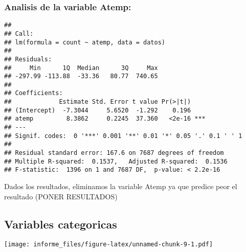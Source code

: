 \documentclass[
]{article}
\begin{document}
\hypertarget{analisis-de-la-variable-atemp}{%
\subsubsection{Analisis de la variable
Atemp:}\label{analisis-de-la-variable-atemp}}

\begin{verbatim}
## 
## Call:
## lm(formula = count ~ atemp, data = datos)
## 
## Residuals:
##     Min      1Q  Median      3Q     Max 
## -297.99 -113.88  -33.36   80.77  740.65 
## 
## Coefficients:
##             Estimate Std. Error t value Pr(>|t|)    
## (Intercept)  -7.3044     5.6520  -1.292    0.196    
## atemp         8.3862     0.2245  37.360   <2e-16 ***
## ---
## Signif. codes:  0 '***' 0.001 '**' 0.01 '*' 0.05 '.' 0.1 ' ' 1
## 
## Residual standard error: 167.6 on 7687 degrees of freedom
## Multiple R-squared:  0.1537,   Adjusted R-squared:  0.1536 
## F-statistic:  1396 on 1 and 7687 DF,  p-value: < 2.2e-16
\end{verbatim}

Dados los resultados, eliminamos la variable Atemp ya que predice peor
el resultado (PONER RESULTADOS)

\hypertarget{variables-categoricas}{%
\subsection{Variables categoricas}\label{variables-categoricas}}

\texttt{[image: informe\_files/figure-latex/unnamed-chunk-9-1.pdf]}
\end{document}
